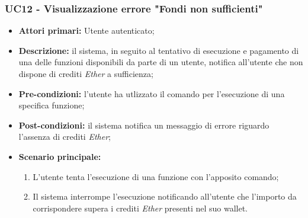\subsubsection{UC12 - Visualizzazione errore "Fondi non sufficienti"}
\begin{itemize}
	\item \textbf{Attori primari:} Utente autenticato;
	\item \textbf{Descrizione:} il sistema, in seguito al tentativo di esecuzione e pagamento di una delle funzioni disponibili da parte di un utente, notifica all'utente che non dispone di crediti \textit{Ether\glo} a sufficienza; 
	\item \textbf{Pre-condizioni:} l'utente ha utlizzato il comando per l'esecuzione di una specifica funzione;
	\item \textbf{Post-condizioni:} il sistema notifica un messaggio di errore riguardo l'assenza di crediti \textit{Ether\glos};
	\item \textbf{Scenario principale:} 
	\begin{enumerate}
		\item L'utente tenta l'esecuzione di una funzione con l'apposito comando;
		\item Il sistema interrompe l'esecuzione notificando all'utente che l'importo da corrispondere supera i crediti \textit{Ether\glo} presenti nel suo wallet.
	\end{enumerate}
\end{itemize}